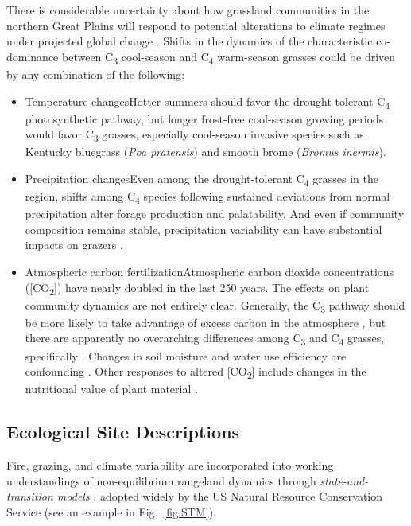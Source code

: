 There is considerable uncertainty about how grassland communities in the northern Great Plains will respond to potential alterations to climate regimes under projected global change \citep{chamaille-jammes2010, mcgranahan2018}. 
Shifts in the dynamics of the characteristic co-dominance between C\textsubscript{3} cool-season and C\textsubscript{4} warm-season grasses could be driven by any combination of the following: 

\begin{itemize}
	\item Temperature changes\textemdash{ }Hotter summers should favor the drought-tolerant C\textsubscript{4} photosynthetic pathway, but longer frost-free cool-season growing periods would favor C\textsubscript{3} grasses, especially cool-season invasive species such as Kentucky bluegrass (\emph{Poa pratensis}) and smooth brome (\emph{Bromus inermis}). 
	\item Precipitation changes\textemdash{ }Even among the drought-tolerant C\textsubscript{4} grasses in the region, shifts among C\textsubscript{4} species following sustained deviations from normal precipitation alter forage production and palatability. 
	And even if community composition remains stable, precipitation variability can have substantial impacts on grazers \citep{craine2013a}. 
	\item Atmospheric carbon fertilization\textemdash{ }Atmospheric carbon dioxide concentrations ([CO\textsubscript{2}]) have nearly doubled in the last 250 years. 
	The effects on plant community dynamics are not entirely clear. 
	Generally, the C\textsubscript{3} pathway should be more likely to take advantage of excess carbon in the atmosphere \citep{temme2013}, but there are apparently no overarching differences among C\textsubscript{3} and C\textsubscript{4} grasses, specifically \citep{wand1999}. 
	Changes in soil moisture and water use efficiency are confounding \citep{chamaille-jammes2010}. 
	Other responses to altered [CO\textsubscript{2}] include changes in the nutritional value of plant material \citep{craine2010, taub2008}.
\end{itemize}

\subsection{Ecological Site Descriptions}\label{ssec:ESDs}

Fire, grazing, and climate variability are incorporated into working understandings of non-equilibrium rangeland dynamics through \emph{state-and-transition models} \citep{westoby1989}, adopted widely by the US Natural Resource Conservation Service (see an example in Fig.~\ref{fig:STM}). 

